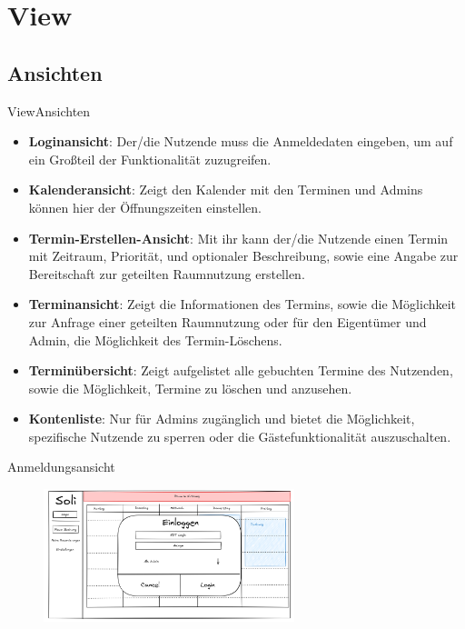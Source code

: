 \documentclass{sdqbeamer}
\begin{document}
\section{View}

\subsection{Ansichten}

\begin{frame}{View}{Ansichten}
    \begin{itemize}
        \item \textbf{Loginansicht}: Der/die Nutzende muss die Anmeldedaten eingeben, um auf ein Großteil der Funktionalität zuzugreifen.
        \item \textbf{Kalenderansicht}: Zeigt den Kalender mit den Terminen und Admins können hier der Öffnungszeiten einstellen.
        \item \textbf{Termin-Erstellen-Ansicht}: Mit ihr kann der/die Nutzende einen Termin mit Zeitraum, Priorität, und optionaler Beschreibung, sowie eine Angabe zur Bereitschaft zur geteilten Raumnutzung erstellen.
        \item \textbf{Terminansicht}: Zeigt die Informationen des Termins, sowie die Möglichkeit zur Anfrage einer geteilten Raumnutzung oder für den Eigentümer und Admin, die Möglichkeit des Termin-Löschens.
        \item \textbf{Terminübersicht}: Zeigt aufgelistet alle gebuchten Termine des Nutzenden, sowie die Möglichkeit, Termine zu löschen und anzusehen.
        \item \textbf{Kontenliste}: Nur für Admins zugänglich und bietet die Möglichkeit, spezifische Nutzende zu sperren oder die Gästefunktionalität auszuschalten.
    \end{itemize}
\end{frame}

\begin{frame}{Anmeldungsansicht}
    \begin{figure}
        \centering
        \includegraphics[width=0.65\textwidth]{pictures/figures/ui/anmeldungsseite}
        \label{fig:login}
    \end{figure}
\end{frame}
\end{document}
